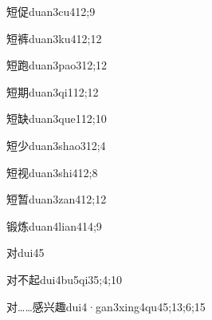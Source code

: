 \begin{verbete}{短促}{duan3cu4}{12;9}
\end{verbete}

\begin{verbete}{短裤}{duan3ku4}{12;12}
\end{verbete}

\begin{verbete}{短跑}{duan3pao3}{12;12}
\end{verbete}

\begin{verbete}{短期}{duan3qi1}{12;12}
\end{verbete}

\begin{verbete}{短缺}{duan3que1}{12;10}
\end{verbete}

\begin{verbete}{短少}{duan3shao3}{12;4}
\end{verbete}

\begin{verbete}{短视}{duan3shi4}{12;8}
\end{verbete}

\begin{verbete}{短暂}{duan3zan4}{12;12}
\end{verbete}

\begin{verbete}{锻炼}{duan4lian4}{14;9}
\end{verbete}

\begin{verbete}{对}{dui4}{5}
\end{verbete}

\begin{verbete}{对不起}{dui4bu5qi3}{5;4;10}
\end{verbete}

\begin{verbete}{对……感兴趣}{dui4·gan3xing4qu4}{5;13;6;15}
\end{verbete}

